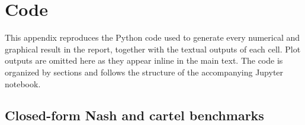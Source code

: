 
\section{Code}
\label{sec:code}

This appendix reproduces the Python code used to generate every numerical
and graphical result in the report, together with the textual outputs of
each cell. Plot outputs are omitted here as they appear inline in the main
text. The code is organized by sections and follows the structure of the
accompanying Jupyter notebook.

\subsection{Closed-form Nash and cartel benchmarks}

